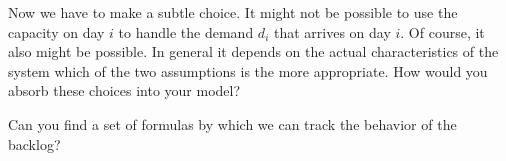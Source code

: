 \begin{exercise}
  Now we have to make a subtle choice. It might not be possible to use
  the capacity on day $i$ to handle the demand $d_i$ that arrives on
  day $i$. Of course, it also might be possible. In general it depends
  on the actual characteristics of the system which of the two
  assumptions is the more appropriate.  How would you absorb these
  choices into your model?

\end{exercise}

 


\begin{exercise}
  Can you find a set of formulas by which we can track the behavior of the backlog? 

\end{exercise}

